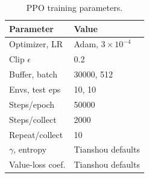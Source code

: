   \begin{table}[!htbp]
  \centering
  \caption{PPO training parameters.}
  \label{tab:ppo-training-parameters}
  \scriptsize
  \setlength{\tabcolsep}{5pt}
  \renewcommand{\arraystretch}{1.05}
  \begin{tabular}{@{}ll@{}}
  \toprule
  Parameter & Value \\
  \midrule
  Optimizer, LR         & Adam, $3{\times}10^{-4}$ \\
  Clip $\epsilon$        & 0.2 \\
  Buffer, batch         & 30000, 512 \\
  Envs, test eps        & 10, 10 \\
  Steps/epoch           & 50000 \\
  Steps/collect         & 2000 \\
  Repeat/collect        & 10 \\
  $\gamma$, entropy     & Tianshou defaults \\
  Value-loss coef.      & Tianshou defaults \\
  \bottomrule
  \end{tabular}
  \end{table}
\fi
